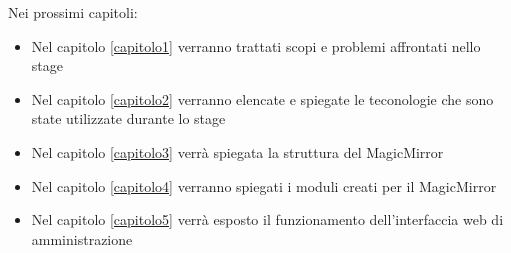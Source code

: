 Nei prossimi capitoli:
\begin{itemize}
\item Nel capitolo \ref{capitolo1} verranno trattati scopi e problemi affrontati nello stage
\item Nel capitolo \ref{capitolo2} verranno elencate e spiegate le teconologie che sono state utilizzate
durante lo stage
\item Nel capitolo \ref{capitolo3} verr\`a spiegata la struttura del MagicMirror
\item Nel capitolo \ref{capitolo4} verranno spiegati i moduli creati per il MagicMirror
\item Nel capitolo \ref{capitolo5} verr\`a esposto il funzionamento dell'interfaccia web di amministrazione
\end{itemize}
